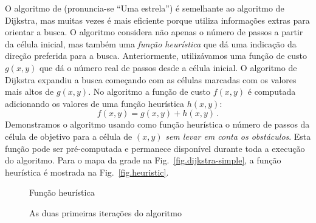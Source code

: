 O algoritmo de \emph{\astar{}} (pronuncia-se ``Uma estrela'') é semelhante ao algoritmo de Dijkstra, mas muitas vezes é mais eficiente porque utiliza informações extras para orientar a busca. O algoritmo \astar{} considera não apenas o número de passos a partir da célula inicial, mas também uma \emph{função heurística} que dá uma indicação da direção preferida para a busca. Anteriormente, utilizávamos uma função de custo $g(x,y)$ que dá o número real de passos desde a célula inicial. O algoritmo de Dijkstra expandiu a busca começando com as células marcadas com os valores mais altos de $g(x,y)$. No algoritmo \astar{} a função de custo $f(x,y)$ é computada adicionando os valores de uma função heurística $h(x,y)$:
\[
f(x,y) = g(x,y) + h(x,y)\,.
\]
Demonstramos o algoritmo \astar{} usando como função heurística o número de passos da célula de objetivo  para a célula de $(x,y)$ \emph{sem levar em conta os obstáculos}. Esta função pode ser pré-computada e permanece disponível durante toda a execução do algoritmo. Para o mapa da grade na Fig.~\ref{fig.dijkstra-simple}, a função heurística é mostrada na Fig.~\ref{fig.heuristic}.

\begin{figure}
\begin{minipage}{.48\textwidth}
\caption{Função heurística}
\label{fig.heuristic}
\end{minipage}
\hspace{\fill}
\begin{minipage}{.48\textwidth}
\caption{As duas primeiras iterações do algoritmo \astar{}}
\label{fig.astar2}
\end{minipage}
\end{figure}


